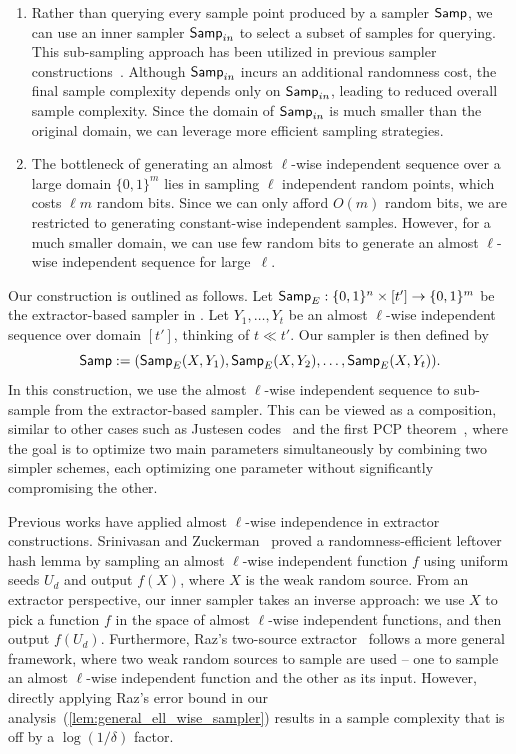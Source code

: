 \documentclass[11pt,letterpaper]{article}
\newcommand{\1}{\mathbbm{1}}
\newcommand{\zo}{\{0, 1\}}
\newcommand{\Smp}{\textup{\textsf{Samp}}}
\begin{document}
\begin{enumerate}
    \item Rather than querying every sample point produced by a sampler $\Smp$, we can use an inner sampler $\Smp_{in}$ to select a subset of samples for querying.  This sub-sampling approach has been utilized in previous sampler constructions~\cite{bellare1994randomness, oded_survey}. Although $\Smp_{in}$ incurs an additional randomness cost, the final sample complexity depends only on $\Smp_{in}$, leading to reduced overall sample complexity. Since the domain of $\Smp_{in}$ is much smaller than the original domain, we can leverage more efficient sampling strategies.
    
\item  The bottleneck of generating an almost $\ell$-wise independent  sequence over a large domain $\zo^m$ lies in sampling $\ell$ independent random points, which costs $\ell m$ random bits. Since we can only afford $O(m)$ random bits, we are restricted to generating constant-wise independent  samples. However, for a much smaller domain, we can use few random bits to generate an almost $\ell$-wise independent  sequence for large~$\ell$. \label{o2}
\end{enumerate}

Our construction is outlined as follows. 
 Let $\Smp_{E}: \zo^n \times [t'] \to \zo^m$ be the extractor-based sampler in \cite{reingold2000entropy}.
 Let $Y_1, \dots, Y_{t}$ be an almost $\ell$-wise independent  sequence over domain $[t']$, thinking of $t \ll t'$. Our sampler is then defined by \[
    \Smp := (\Smp_{E}(X, Y_1), \Smp_{E}(X, Y_2), \dots, \Smp_{E}(X, Y_{t})).
 \]
In this construction, we use the almost $\ell$-wise independent  sequence to sub-sample from the extractor-based sampler. This can be viewed as a composition, similar to other cases such as Justesen codes~\cite{Jus72} and the first PCP theorem~\cite{PCP}, where the goal is to optimize two main parameters simultaneously by combining two simpler schemes, each optimizing one parameter without significantly compromising the other.

Previous works have applied almost $\ell$-wise independence in extractor constructions. Srinivasan and Zuckerman~\cite{SZ99} proved a randomness-efficient leftover hash lemma by sampling an almost $\ell$-wise independent function $f$ using uniform seeds $U_d$ and output $f(X)$, where $X$ is the weak random source. From an extractor perspective, our inner sampler takes an inverse approach: we use $X$ to pick a function $f$ in the space of almost $\ell$-wise independent functions, and then output $f(U_d)$. Furthermore, Raz's two-source extractor~\cite{Raz05} follows a more general framework, where two weak random sources to sample are used -- one to sample an almost $\ell$-wise independent function and the other as its input. However, directly applying Raz's error bound in our analysis~(\cref{lem:general_ell_wise_sampler}) results in a sample complexity that is off by a $\log (1 / \delta)$ factor.
\end{document}
